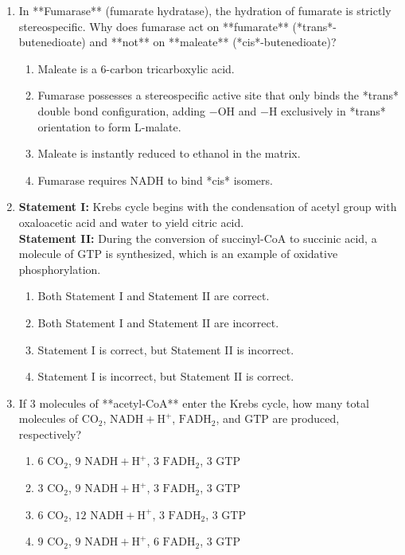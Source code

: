 \documentclass[11pt, a4paper]{article}
\begin{document}
\begin{enumerate}[label=\textbf{\arabic*.}]
\item In **Fumarase** (fumarate hydratase), the hydration of fumarate is strictly stereospecific. Why does fumarase act on **fumarate** (*trans*-butenedioate) and **not** on **maleate** (*cis*-butenedioate)?
\begin{enumerate}[label=(\Alph*)]
    \item Maleate is a $6\text{-carbon}$ tricarboxylic acid.
    \item Fumarase possesses a stereospecific active site that only binds the *trans* double bond configuration, adding $-\text{OH}$ and $-\text{H}$ exclusively in *trans* orientation to form L-malate.
    \item Maleate is instantly reduced to ethanol in the matrix.
    \item Fumarase requires $\text{NADH}$ to bind *cis* isomers.
\end{enumerate}

\item \textbf{Statement I:} Krebs cycle begins with the condensation of acetyl group with oxaloacetic acid and water to yield citric acid. \\
\textbf{Statement II:} During the conversion of succinyl-CoA to succinic acid, a molecule of $\text{GTP}$ is synthesized, which is an example of oxidative phosphorylation.
\begin{enumerate}[label=(\Alph*)]
    \item Both Statement I and Statement II are correct.
    \item Both Statement I and Statement II are incorrect.
    \item Statement I is correct, but Statement II is incorrect.
    \item Statement I is incorrect, but Statement II is correct.
\end{enumerate}

\item If $3\text{ molecules}$ of **acetyl-CoA** enter the Krebs cycle, how many total molecules of $\text{CO}_2$, $\text{NADH} + \text{H}^+$, $\text{FADH}_2$, and $\text{GTP}$ are produced, respectively?
\begin{enumerate}[label=(\Alph*)]
    \item $6\text{ CO}_2$, $9\text{ NADH} + \text{H}^+$, $3\text{ FADH}_2$, $3\text{ GTP}$
    \item $3\text{ CO}_2$, $9\text{ NADH} + \text{H}^+$, $3\text{ FADH}_2$, $3\text{ GTP}$
    \item $6\text{ CO}_2$, $12\text{ NADH} + \text{H}^+$, $3\text{ FADH}_2$, $3\text{ GTP}$
    \item $9\text{ CO}_2$, $9\text{ NADH} + \text{H}^+$, $6\text{ FADH}_2$, $3\text{ GTP}$
\end{enumerate}

\end{enumerate}
\end{document}
